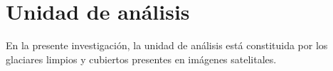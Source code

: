 \section{Unidad de análisis}
\label{sec:UnidadAnalisis}

En la presente investigación, la unidad de análisis está constituida por los glaciares limpios y cubiertos presentes en imágenes satelitales.
